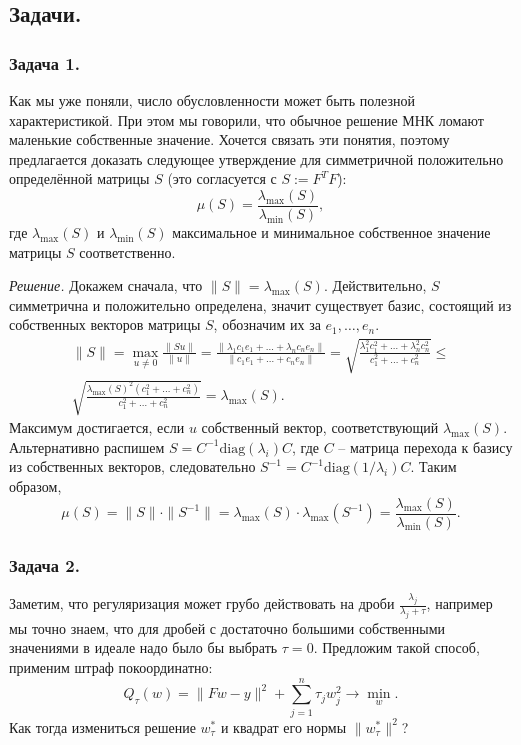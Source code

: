 \newpage
\subsection*{Задачи.}

\subsubsection*{Задача 1.} Как мы уже поняли, число обусловленности может быть полезной характеристикой. При этом мы говорили, что обычное решение МНК ломают маленькие собственные значение. Хочется связать эти понятия, поэтому предлагается доказать следующее утверждение для симметричной положительно определённой матрицы $S$ (это согласуется с $S := F^TF$):
$$\mu(S) = \frac{\lambda_{\max}(S)}{\lambda_{\min}(S)},$$
где $\lambda_{\max}(S)$ и $\lambda_{\min}(S)$ максимальное и минимальное собственное значение матрицы $S$ соответственно.

\noindent\textit{Решение.} Докажем сначала, что $\|S\| = \lambda_{\max}(S)$. Действительно, $S$ симметрична и положительно определена, значит существует базис, состоящий из собственных векторов матрицы $S$, обозначим их за $e_1, \dots, e_n$.
\begin{gather*}
\|S\| = \max_{u \not= 0} \frac{\|Su\|}{\|u\|} = \frac{\|\lambda_1c_1e_1 + \dots + \lambda_nc_ne_n\|}{\|c_1e_1 + \dots + c_ne_n\|} = \sqrt{\frac{\lambda_1^2c_1^2 + \dots + \lambda_n^2c_n^2}{c_1^2 + \dots + c_n^2}} \leqslant \\
\sqrt{\frac{\lambda_{\max}(S)^2(c_1^2 + \dots + c_n^2)}{c_1^2 + \dots + c_n^2}} = \lambda_{\max}(S).
\end{gather*}
Максимум достигается, если $u$ собственный вектор, соответствующий $\lambda_{\max}(S)$. Альтернативно распишем $S = C^{-1} \text{diag}(\lambda_i) C$, где $C$ -- матрица перехода к базису из собственных векторов, следовательно $S^{-1} = C^{-1} \text{diag}(1/\lambda_i) C$. Таким образом,
$$\mu(S) = \|S\| \cdot \|S^{-1}\| = \lambda_{\max}(S) \cdot \lambda_{\max}(S^{-1}) = \frac{\lambda_{\max}(S)}{\lambda_{\min}(S)}.$$

\subsubsection*{Задача 2.} Заметим, что регуляризация может грубо действовать на дроби $\displaystyle\frac{\lambda_j}{\lambda_j + \tau}$, например мы точно знаем, что для дробей с достаточно большими собственными значениями в идеале надо было бы выбрать $\tau = 0$. Предложим такой способ, применим штраф покоординатно:
$$Q_\tau(w) = \|Fw - y\|^2 + \sum_{j=1}^n\tau_jw_j^2 \to \min_w.$$
Как тогда измениться решение $w_\tau^*$ и квадрат его нормы $\|w_\tau^*\|^2$?

